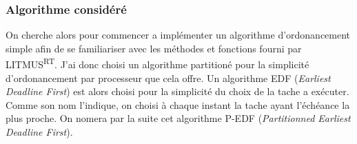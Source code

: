 \subsubsection{Algorithme considéré}

On cherche alors pour commencer a implémenter un algorithme d'ordonancement simple afin de se familiariser avec les méthodes et fonctions fourni par LITMUS\textsuperscript{RT}. J'ai donc choisi un algorithme partitioné pour la simplicité d'ordonancement par \gls{processeur} que cela offre. Un algorithme EDF (\textit{Earliest Deadline First}) est alors choisi pour la simplicité du choix de la tache a exécuter. Comme son nom l'indique, on choisi à chaque instant la tache ayant l'échéance la plus proche. On nomera par la suite cet algorithme P-EDF (\textit{Partitionned Earliest Deadline First}).

